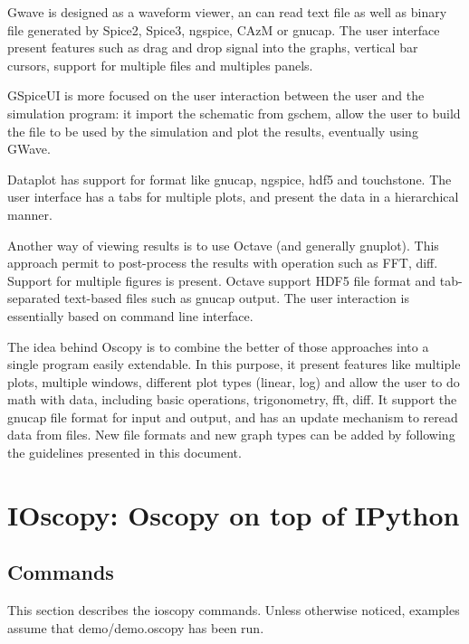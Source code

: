 \documentclass[a4paper,11pt]{article}
\begin{document}
Gwave is designed as a waveform viewer, an can read text file as well as binary file generated by Spice2, Spice3, ngspice, CAzM or gnucap.
The user interface present features such as drag and drop signal into the graphs, vertical bar cursors, support for multiple files and multiples panels.

GSpiceUI is more focused on the user interaction between the user and the simulation program: it import the schematic from gschem, allow the user to build the file to be used by the simulation and plot the results, eventually using GWave.

Dataplot has support for format like gnucap, ngspice, hdf5 and touchstone.
The user interface has a tabs for multiple plots, and present the data in a hierarchical manner.

Another way of viewing results is to use Octave (and generally gnuplot).
This approach permit to post-process the results with operation such as FFT, diff.
Support for multiple figures is present.
Octave support HDF5 file format and tab-separated text-based files such as gnucap output.
The user interaction is essentially based on command line interface.

The idea behind Oscopy is to combine the better of those approaches into a single program easily extendable.
In this purpose, it present features like multiple plots, multiple windows, different plot types (linear, log) and allow the user to do math with data, including basic operations, trigonometry, fft, diff.
It support the gnucap file format for input and output, and has an update mechanism to reread data from files.
New file formats and new graph types can be added by following the guidelines presented in this document.

\section{IOscopy: Oscopy on top of IPython}


\subsection{Commands}
This section describes the ioscopy commands. Unless otherwise noticed, examples assume that demo/demo.oscopy has been run.
\end{document}
